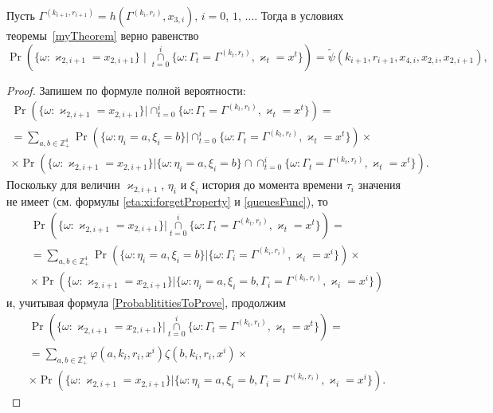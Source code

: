 \documentclass[a4paper,12pt,russian]{extarticle}
\begin{document}
\begin{corollary}
Пусть $\Gamma^{(k_{i+1},r_{i+1})}=h(\Gamma^{(k_i,r_i)},x_{3,i})$, $i=0$, $1$, $\ldots$. Тогда в условиях теоремы~\ref{myTheorem} верно равенство
\begin{equation}
\Pr (\{ \omega \colon \varkappa_{2,i+1} = x_{2,i+1}\} \mid\mathop{\cap}\limits_{t=0}^{i}\{\omega\colon \Gamma_t=\Gamma^{(k_t,r_t)}, \varkappa_t=x^t\})=\widetilde{\psi}(k_{i+1},r_{i+1},x_{4,i},x_{2,i},x_{2,i+1}),
\label{kappa:2:conditional}
\end{equation}
\end{corollary}
\begin{proof}
Запишем по формуле полной вероятности:
\begin{multline*}
\Pr (\{ \omega \colon \varkappa_{2,i+1} = x_{2,i+1}\} |\cap_{t=0}^{i}\{\omega\colon \Gamma_t=\Gamma^{(k_t,r_t)}, \varkappa_t=x^t\}) = \\
= \sum_{a,b\in \mathbb{Z}_+^4} \Pr (\{ \omega \colon \eta_i=a, \xi_i=b\} |\cap_{t=0}^{i}\{\omega\colon \Gamma_t=\Gamma^{(k_t,r_t)}, \varkappa_t=x^t\}) \times \\
\times \Pr (\{ \omega \colon \varkappa_{2,i+1} = x_{2,i+1}\} |\{\omega\colon \eta_i=a, \xi_i=b\}\cap \cap_{t=0}^{i}\{\omega\colon \Gamma_t=\Gamma^{(k_t,r_t)}, \varkappa_t=x^t\}).
\end{multline*}
Поскольку для величин $\varkappa_{2,i+1}$, $\eta_i$ и $\xi_i$ история до момента времени $\tau_i$ значения не имеет (см. формулы \eqref{eta:xi:forgetProperty} и \eqref{queuesFunc}), то
\begin{multline*}
\Pr (\{ \omega \colon \varkappa_{2,i+1} = x_{2,i+1}\} |\mathop{\cap}\limits_{t=0}^{i}\{\omega\colon \Gamma_t=\Gamma^{(k_t,r_t)}, \varkappa_t=x^t\}) = \\
=\sum_{a,b\in \mathbb{Z}_+^4} \Pr (\{ \omega \colon \eta_i=a, \xi_i=b\} |\{\omega\colon \Gamma_i=\Gamma^{(k_i,r_i)}, \varkappa_i=x^i\}) \times \\
\times \Pr (\{ \omega \colon \varkappa_{2,i+1} = x_{2,i+1}\} |\{\omega\colon \eta_i=a, \xi_i=b, \Gamma_i=\Gamma^{(k_i,r_i)}, \varkappa_i=x^i\}) 
\end{multline*}
и, учитывая формула \eqref{ProbablititiesToProve}, продолжим
\begin{multline*}
\Pr (\{ \omega \colon \varkappa_{2,i+1} = x_{2,i+1}\} |\mathop{\cap}\limits_{t=0}^{i}\{\omega\colon \Gamma_t=\Gamma^{(k_t,r_t)}, \varkappa_t=x^t\}) =\\
=\sum_{a,b\in \mathbb{Z}_+^4} \varphi(a,k_i,r_i,x^i)\zeta(b,k_i,r_i,x^i) \times\\
\times \Pr (\{ \omega \colon \varkappa_{2,i+1} = x_{2,i+1}\} |\{\omega\colon \eta_i=a, \xi_i=b, \Gamma_i=\Gamma^{(k_i,r_i)}, \varkappa_i=x^i\}).
\end{multline*}


\end{proof}
\end{document}
